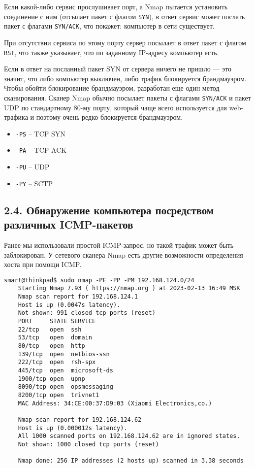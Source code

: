 Если какой-либо сервис прослушивает порт, а Nmap пытается установить соединение с ним (отсылает пакет с флагом \texttt{SYN}), в ответ сервис может послать пакет с флагами \texttt{SYN/ACK}, что покажет: компьютер в сети существует.

При отсутствии сервиса по этому порту сервер посылает в ответ пакет с флагом \texttt{RST}, что также указывает, что по заданному IP-адресу компьютер есть.

Если в ответ на посланный пакет SYN от сервера ничего не пришло — это значит, что либо компьютер выключен, либо трафик блокируется брандмауэром. Чтобы обойти блокирование брандмауэром, разработан еще один метод сканирования. Сканер Nmap обычно посылает пакеты с флагами \texttt{SYN/ACK} и пакет UDP по стандартному 80-му порту, который чаще всего используется для web-трафика и поэтому очень редко блокируется брандмауэром.

\begin{itemize}
    \item \texttt{-PS} -- TCP SYN
    \item \texttt{-PA} -- TCP ACK
    \item \texttt{-PU} -- UDP
    \item \texttt{-PY} -- SCTP
\end{itemize}

\subsection*{2.4. Обнаружение компьютера посредством различных ICMP-пакетов}

Ранее мы использовали простой ICMP-запрос, но такой трафик может быть заблокирован. У сетевого сканера Nmap есть другие возможности определения хоста при помощи ICMP.


\begin{Verbatim}[frame=single,breaklines=true,breakanywhere=true]
    smart@thinkpad$ sudo nmap -PE -PP -PM 192.168.124.0/24
    Starting Nmap 7.93 ( https://nmap.org ) at 2023-02-13 16:49 MSK
    Nmap scan report for 192.168.124.1
    Host is up (0.0047s latency).
    Not shown: 991 closed tcp ports (reset)
    PORT     STATE SERVICE
    22/tcp   open  ssh
    53/tcp   open  domain
    80/tcp   open  http
    139/tcp  open  netbios-ssn
    222/tcp  open  rsh-spx
    445/tcp  open  microsoft-ds
    1900/tcp open  upnp
    8090/tcp open  opsmessaging
    8200/tcp open  trivnet1
    MAC Address: 34:CE:00:37:D9:03 (Xiaomi Electronics,co.)

    Nmap scan report for 192.168.124.62
    Host is up (0.000012s latency).
    All 1000 scanned ports on 192.168.124.62 are in ignored states.
    Not shown: 1000 closed tcp ports (reset)

    Nmap done: 256 IP addresses (2 hosts up) scanned in 3.38 seconds
\end{Verbatim}

